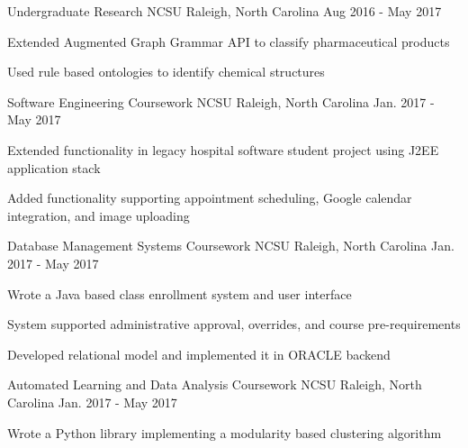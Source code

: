 
\begin{cventries}
	
\cventry
	{Undergraduate Research} %
	{NCSU} %
	{Raleigh, North Carolina} %
	{Aug 2016 - May 2017} %
	{
		\begin{cvitems} %
			\item {Extended Augmented Graph Grammar API to classify pharmaceutical products}
			\item {Used rule based ontologies to identify chemical structures}
		\end{cvitems}
	}

\cventry
	{Software Engineering Coursework} %
	{NCSU} %
	{Raleigh, North Carolina} %
	{Jan. 2017 - May 2017} %
	{
		\begin{cvitems} %
			\item {Extended functionality in legacy hospital software student project using J2EE application stack}
			\item {Added functionality supporting appointment scheduling, Google calendar integration, and image uploading}
		\end{cvitems}
	}

\cventry
	{Database Management Systems Coursework} %
	{NCSU} %
	{Raleigh, North Carolina} %
	{Jan. 2017 - May 2017} %
	{
		\begin{cvitems} %
			\item {Wrote a Java based class enrollment system and user interface}
			\item {System supported administrative approval, overrides, and course pre-requirements}
			\item {Developed relational model and implemented it in ORACLE backend}
		\end{cvitems}
	}

\cventry
	{Automated Learning and Data Analysis Coursework} %
	{NCSU} %
	{Raleigh, North Carolina} %
	{Jan. 2017 - May 2017} %
	{
		\begin{cvitems} %
			\item {Wrote a Python library implementing a modularity based clustering algorithm}
		\end{cvitems}
	}


\end{cventries}
